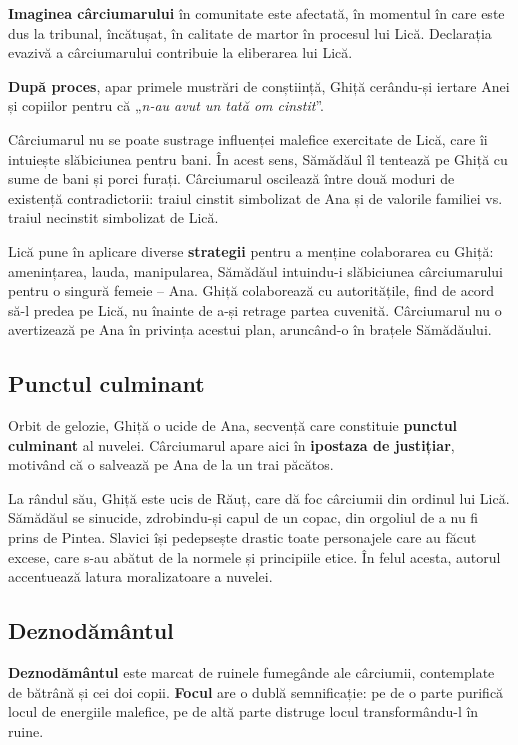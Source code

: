 \documentclass{article}
\newcommand{\qu}[1]{„\emph{#1}”}
\begin{document}
\textbf{Imaginea cârciumarului} în comunitate este afectată, în momentul în care este dus la tribunal, încătușat, în calitate de martor în procesul lui Lică. Declarația evazivă a cârciumarului contribuie la eliberarea lui Lică.

\textbf{După proces}, apar primele mustrări de conștiință, Ghiță cerându-și iertare Anei și copiilor pentru că \qu{n-au avut un tată om cinstit}.

Cârciumarul nu se poate sustrage influenței malefice exercitate de Lică, care îi intuiește slăbiciunea pentru bani. În acest sens, Sămădăul îl tentează pe Ghiță cu sume de bani și porci furați. Cârciumarul oscilează între două moduri de existență contradictorii: traiul cinstit simbolizat de Ana și de valorile familiei vs. traiul necinstit simbolizat de Lică.

Lică pune în aplicare diverse \textbf{strategii} pentru a menține colaborarea cu Ghiță: amenințarea, lauda, manipularea, Sămădăul intuindu-i slăbiciunea cârciumarului pentru o singură femeie -- Ana.
Ghiță colaborează cu autoritățile, find de acord să-l predea pe Lică, nu înainte de a-și retrage partea cuvenită. Cârciumarul nu o avertizează pe Ana în privința acestui plan, aruncând-o în brațele Sămădăului.

\subsection{Punctul culminant}
Orbit de gelozie, Ghiță o ucide de Ana, secvență care constituie \textbf{punctul culminant} al nuvelei. Cârciumarul apare aici în \textbf{ipostaza de justițiar}, motivând că o salvează pe Ana de la un trai păcătos.

La rândul său, Ghiță este ucis de Răuț, care dă foc cârciumii din ordinul lui Lică. Sămădăul se sinucide, zdrobindu-și capul de un copac, din orgoliul de a nu fi prins de Pintea. Slavici își pedepsește drastic toate personajele care au făcut excese, care s-au abătut de la normele și principiile etice. În felul acesta, autorul accentuează latura moralizatoare a nuvelei.

\subsection{Deznodământul}
\textbf{Deznodământul} este marcat de ruinele fumegânde ale cârciumii, contemplate de bătrână și cei doi copii. \textbf{Focul} are o dublă semnificație: pe de o parte purifică locul de energiile malefice, pe de altă parte distruge locul transformându-l în ruine.
\end{document}
